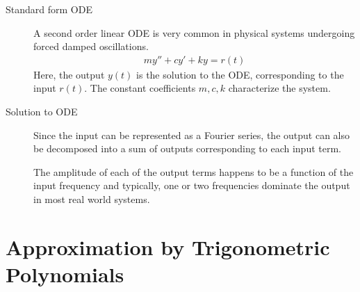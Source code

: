 \begin{description}
    \item[Standard form ODE] A second order linear ODE is very common in physical systems
        undergoing forced damped oscillations.
        \begin{align}
            my'' + cy' + ky = r(t)
        \end{align}
        Here, the output $ y(t) $ is the solution to the ODE, corresponding to the input
        $ r(t) $. The constant coefficients $ m, c, k $ characterize the system.

    \item[Solution to ODE] Since the input can be represented as a Fourier series,
        the output can also be decomposed into a sum of outputs corresponding to each
        input term. \par
        The amplitude of each of the output terms happens to be a function of the input
        frequency and typically, one or two frequencies dominate the output in most real
        world systems.
\end{description}

\section{Approximation by Trigonometric Polynomials}

